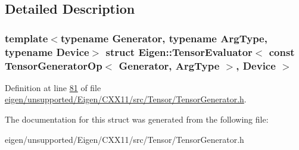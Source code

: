 \subsection{Detailed Description}
\subsubsection*{template$<$typename Generator, typename Arg\+Type, typename Device$>$\newline
struct Eigen\+::\+Tensor\+Evaluator$<$ const Tensor\+Generator\+Op$<$ Generator, Arg\+Type $>$, Device $>$}



Definition at line \hyperlink{eigen_2unsupported_2_eigen_2_c_x_x11_2src_2_tensor_2_tensor_generator_8h_source_l00081}{81} of file \hyperlink{eigen_2unsupported_2_eigen_2_c_x_x11_2src_2_tensor_2_tensor_generator_8h_source}{eigen/unsupported/\+Eigen/\+C\+X\+X11/src/\+Tensor/\+Tensor\+Generator.\+h}.



The documentation for this struct was generated from the following file\+:\begin{DoxyCompactItemize}
\item 
eigen/unsupported/\+Eigen/\+C\+X\+X11/src/\+Tensor/\+Tensor\+Generator.\+h\end{DoxyCompactItemize}
